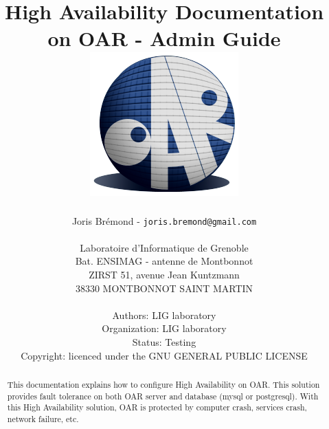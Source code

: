 \documentclass[a4paper,10pt]{report}
\title{High Availability Documentation on OAR - Admin Guide\\
\includegraphics[scale=0.7]{schema/oar_logo_detoure.png}}
\author{Joris Brémond - \texttt{joris.bremond@gmail.com}\\
\\
Laboratoire d'Informatique de Grenoble\\
Bat. ENSIMAG - antenne de Montbonnot\\
ZIRST 51, avenue Jean Kuntzmann\\
38330 MONTBONNOT SAINT MARTIN\\
\\
Authors: LIG laboratory\\
Organization: LIG laboratory\\
Status: Testing\\
Copyright: licenced under the GNU GENERAL PUBLIC LICENSE\\
}
\begin{document}
\maketitle
\tableofcontents

\begin{abstract}
This documentation explains how to configure High Availability on OAR. This solution provides fault tolerance on both OAR server and database (mysql or postgresql).
With this High Availability solution, OAR is protected by computer crash, services crash, network failure, etc.
\end{abstract}












  
\end{document}
